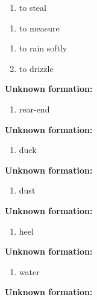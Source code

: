 \begin{enumerate}
\item to steal
\end{enumerate}
\begin{enumerate}
\item to measure
\end{enumerate}
\begin{enumerate}
\item to rain softly
\item to drizzle
\end{enumerate}
\noindent\textbf{Unknown formation:}\\

\begin{enumerate}
\item rear-end
\end{enumerate}
\noindent\textbf{Unknown formation:}\\

\begin{enumerate}
\item duck
\end{enumerate}
\noindent\textbf{Unknown formation:}\\

\begin{enumerate}
\item dust
\end{enumerate}
\noindent\textbf{Unknown formation:}\\

\begin{enumerate}
\item heel
\end{enumerate}
\noindent\textbf{Unknown formation:}\\

\begin{enumerate}
\item water
\end{enumerate}
\noindent\textbf{Unknown formation:}\\

